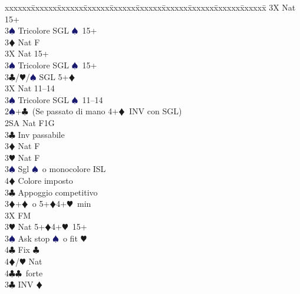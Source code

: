 \documentclass[a4paper,italian]{article}
\newcommand{\BC}{\textcolor{OliveGreen}{$\clubsuit$}}
\newcommand{\BD}{\textcolor{RedOrange}{$\vardiamondsuit$}}
\newcommand{\BH}{\textcolor{Red2}{$\varheartsuit${}}}
\newcommand{\BS}{\textcolor{MidnightBlue}{$\spadesuit${}}}
\newenvironment{bidtable}
{\begin{tabbing}

    xxxxxx\=xxxxxx\=xxxxxx\=xxxxxx\=xxxxxx\=xxxxxx\=xxxxxx\=xxxxxx\=xxxxxx\=xxxxxx\=\kill}
{\end{tabbing} }%
\begin{document}
\begin{multicols*}{2}
\begin{bidtable}
                                            3X \> Nat 15+\\
                                            3\BS \> Tricolore SGL \BS\ 15+\-\\
                                            3\BD \> Nat F\+\\
                                            3X \> Nat 15+\\
                                            3\BS \> Tricolore SGL \BS\ 15+\-\\
                                            3\BC/\BH/\BS \> SGL 5+\BD \-\\
                                            3X \> Nat 11--14\\
                                            3\BS \> Tricolore SGL \BS\  11--14\-\\
                                            2\BS {}+\BC\ (Se passato di mano 4+\BD\ INV con SGL)\+\\
                                            2SA \> Nat F1G\+\\
                                            3\BC \> Inv passabile\\
                                            3\BD \> Nat F\\
                                            3\BH \> Nat F\\
                                            3\BS \> Sgl \BS\ o monocolore ISL\\
                                            4\BD \> Colore imposto\-\\
                                            3\BC \> Appoggio competitivo\\
                                            3\BD {}+\BD\ o 5+\BD 4+\BH\ min\+\\
                                            3X \> FM\-\\
                                            3\BH \> Nat 5+\BD 4+\BH\ 15+\+\\
                                            3\BS \> Ask stop \BS\ o fit \BH \\
                                            4\BC \> Fix \BC \\
                                            4\BD/\BH \> Nat\-\\
                                            4\BC {}\BC\ forte\-\\
                                            3\BC \> INV \BD \\

\end{bidtable}
\end{multicols*}
\end{document}
